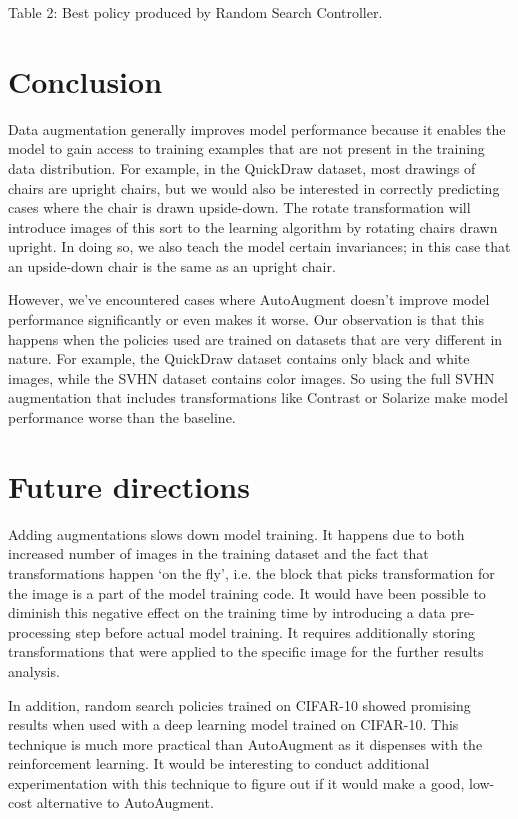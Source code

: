 \documentclass[10pt,twocolumn,letterpaper]{article}
\begin{document}
Table 2: Best policy produced by Random Search Controller.




\section{Conclusion}

Data augmentation generally improves model performance because it enables the model to gain access to training examples that are not present in the training data distribution. For example, in the QuickDraw dataset, most drawings of chairs are upright chairs, but we would also be interested in correctly predicting cases where the chair is drawn upside-down. The rotate transformation will introduce images of this sort to the learning algorithm by rotating chairs drawn upright. In doing so, we also teach the model certain invariances; in this case that an upside-down chair is the same as an upright chair.

However, we’ve encountered cases where AutoAugment doesn’t improve model performance significantly or even makes it worse. Our observation is that this happens when the policies used are trained on datasets that are very different in nature. For example, the QuickDraw dataset contains only black and white images, while the SVHN dataset contains color images. So using the full SVHN augmentation that includes transformations like Contrast or Solarize make model performance worse than the baseline. 

\section{Future directions}
Adding augmentations slows down model training. It happens due to both increased number of images in the training dataset and the fact that transformations happen ‘on the fly’, i.e. the block that picks transformation for the image is a part of the model training code. It would have been possible to diminish this negative effect on the training time by introducing a data pre-processing step before actual model training. It requires additionally storing transformations that were applied to the specific image for the further results analysis.

In addition, random search policies trained on CIFAR-10 showed promising results when used with a deep learning model trained on CIFAR-10. This technique is much more practical than AutoAugment as it dispenses with the reinforcement learning. It would be interesting to conduct additional experimentation with this technique to figure out if it would make a good, low-cost alternative to AutoAugment. 
\end{document}
